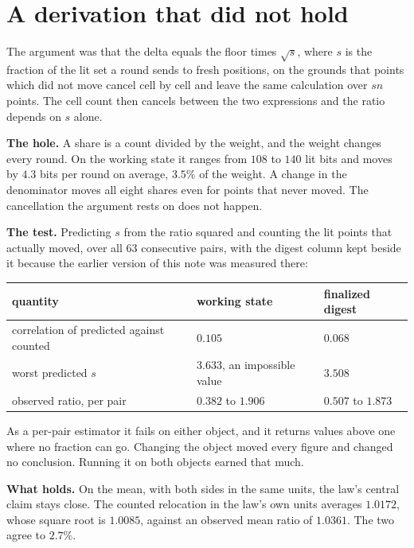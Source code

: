 \section{A derivation that did not hold}

The argument was that the delta equals the floor times \(\sqrt{s}\), where \(s\) is the fraction of the lit set a round sends to fresh positions, on the grounds that points which did not move cancel cell by cell and leave the same calculation over \(s n\) points. The cell count then cancels between the two expressions and the ratio depends on \(s\) alone.

\textbf{The hole.} A share is a count divided by the weight, and the weight changes every round. On the working state it ranges from \(108\) to \(140\) lit bits and moves by \(4.3\) bits per round on average, \(3.5\%\) of the weight. A change in the denominator moves all eight shares even for points that never moved. The cancellation the argument rests on does not happen.

\textbf{The test.} Predicting \(s\) from the ratio squared and counting the lit points that actually moved, over all \(63\) consecutive pairs, with the digest column kept beside it because the earlier version of this note was measured there:

\begin{center}
\begin{tabular}{@{}lll@{}}
\toprule
quantity & working state & finalized digest \\
\midrule
correlation of predicted against counted & \(0.105\) & \(0.068\) \\
worst predicted \(s\) & \(3.633\), an impossible value & \(3.508\) \\
observed ratio, per pair & \(0.382\) to \(1.906\) & \(0.507\) to \(1.873\) \\
\bottomrule
\end{tabular}
\end{center}

As a per-pair estimator it fails on either object, and it returns values above one where no fraction can go. Changing the object moved every figure and changed no conclusion. Running it on both objects earned that much.

\textbf{What holds.} On the mean, with both sides in the same units, the law's central claim stays close. The counted relocation in the law's own units averages \(1.0172\), whose square root is \(1.0085\), against an observed mean ratio of \(1.0361\). The two agree to \(2.7\%\).

